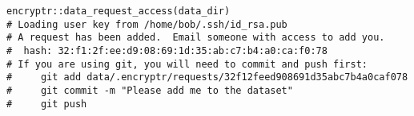 \documentclass[class=minimal,border=0]{standalone}
\begin{document}
%
\begin{BVerbatim}[bgcolor=b-darkgrey]
encryptr::data_request_access(data_dir)
# Loading user key from /home/bob/.ssh/id_rsa.pub
# A request has been added.  Email someone with access to add you.
#  hash: 32:f1:2f:ee:d9:08:69:1d:35:ab:c7:b4:a0:ca:f0:78
# If you are using git, you will need to commit and push first:
#     git add data/.encryptr/requests/32f12feed908691d35abc7b4a0caf078
#     git commit -m "Please add me to the dataset"
#     git push
\end{BVerbatim}
\end{document}
